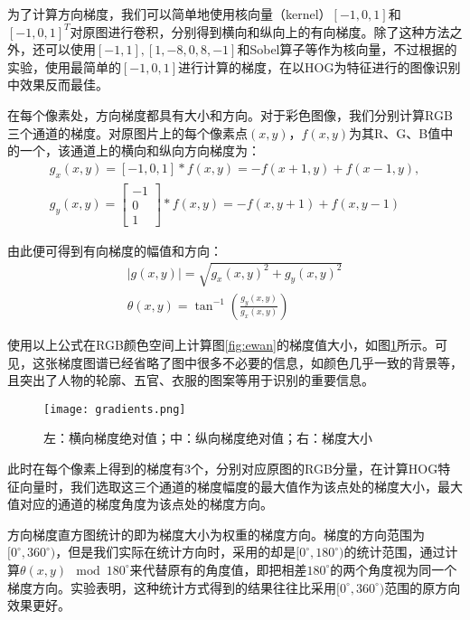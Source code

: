   为了计算方向梯度，我们可以简单地使用核向量（kernel）$[-1,0,1]$和$[-1,0,1]^{T}$对原图进行卷积，分别得到横向和纵向上的有向梯度。除了这种方法之外，还可以使用$[-1,1],[1,-8,0,8,-1]$和Sobel算子等作为核向量，不过根据\citet{dalal2005histograms}的实验，使用最简单的$[-1,0,1]$进行计算的梯度，在以HOG为特征进行的图像识别中效果反而最佳。

  在每个像素处，方向梯度都具有大小和方向。对于彩色图像，我们分别计算RGB三个通道的梯度。对原图片上的每个像素点$(x,y)$，$f(x,y)$为其R、G、B值中的一个，该通道上的横向和纵向方向梯度为：
\begin{gather*}
g_x(x,y)=[-1,0,1]\ast f(x,y)=-f(x+1,y)+f(x-1,y),\\
g_y(x,y)=\begin{bmatrix}
-1 \\
0 \\
1
\end{bmatrix}
\ast f(x,y) = -f(x,y+1)+f(x,y-1)
\end{gather*}

  由此便可得到有向梯度的幅值和方向：
\begin{gather*}
|g(x,y)|=\sqrt{g_x (x,y)^2 + g_y (x,y)^2} \\
\theta (x,y)=\tan^{-1}\left(\frac{g_y(x,y)}{g_x(x,y)}\right)
\end{gather*}
  
  使用以上公式在RGB颜色空间上计算图\ref{fig:ewan}的梯度值大小，如图\ref{fig:gradients}所示。可见，这张梯度图谱已经省略了图中很多不必要的信息，如颜色几乎一致的背景等，且突出了人物的轮廓、五官、衣服的图案等用于识别的重要信息。

\begin{figure}[htb]
  \centering
  \texttt{[image: gradients.png]}
  \caption{左：横向梯度绝对值；中：纵向梯度绝对值；右：梯度大小}
  \label{fig:gradients}
\end{figure}

  此时在每个像素上得到的梯度有3个，分别对应原图的RGB分量，在计算HOG特征向量时，我们选取这三个通道的梯度幅度的最大值作为该点处的梯度大小，最大值对应的通道的梯度角度为该点处的梯度方向。

  方向梯度直方图统计的即为梯度大小为权重的梯度方向。梯度的方向范围为$[0^{\circ},360^{\circ})$，但是我们实际在统计方向时，采用的却是$[0^{\circ},180^{\circ})$的统计范围，通过计算$\theta(x,y) \mod 180^{\circ}$来代替原有的角度值，即把相差$180^{\circ}$的两个角度视为同一个梯度方向。实验表明，这种统计方式得到的结果往往比采用$[0^{\circ},360^{\circ})$范围的原方向效果更好\cite{dalal2005histograms}。

